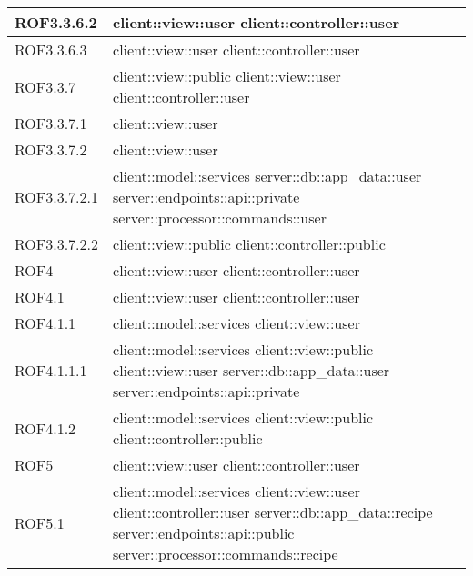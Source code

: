 \begin{center}
\begin{longtable}{| p{4cm} | p{8cm} |}
ROF3.3.6.2 & client::view::user \newline client::controller::user \\
\hline
ROF3.3.6.3 & client::view::user \newline client::controller::user \\
\hline
ROF3.3.7 & client::view::public \newline client::view::user \newline client::controller::user \\
\hline
ROF3.3.7.1 & client::view::user \\
\hline
ROF3.3.7.2 & client::view::user \\
\hline
ROF3.3.7.2.1 & client::model::services \newline server::db::app\_data::user \newline server::endpoints::api::private \newline server::processor::commands::user \\
\hline
ROF3.3.7.2.2 & client::view::public \newline client::controller::public \\
\hline
ROF4 & client::view::user \newline client::controller::user \\
\hline
ROF4.1 & client::view::user \newline client::controller::user \\
\hline
ROF4.1.1 & client::model::services \newline client::view::user \\
\hline
ROF4.1.1.1 & client::model::services \newline client::view::public \newline client::view::user \newline server::db::app\_data::user \newline server::endpoints::api::private \\
\hline
ROF4.1.2 & client::model::services \newline client::view::public \newline client::controller::public \\
\hline
ROF5 & client::view::user \newline client::controller::user \\
\hline
ROF5.1 & client::model::services \newline client::view::user \newline client::controller::user \newline server::db::app\_data::recipe \newline server::endpoints::api::public \newline server::processor::commands::recipe \\

\end{longtable}
\end{center}
